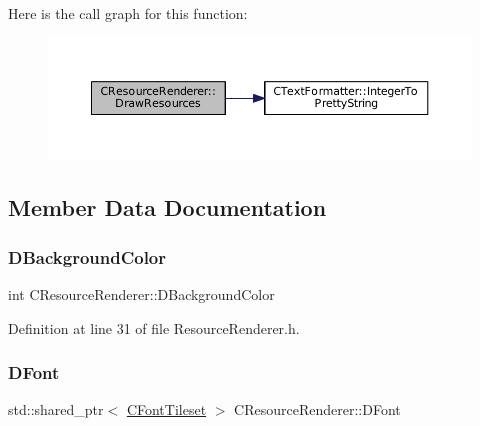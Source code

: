 Here is the call graph for this function\+:
\nopagebreak
\begin{figure}[H]
\begin{center}
\leavevmode
\includegraphics[width=350pt]{classCResourceRenderer_ad10676ab10fe217aebbc3dca68d745b0_cgraph}
\end{center}
\end{figure}


\subsection{Member Data Documentation}
\hypertarget{classCResourceRenderer_a7985a8b9266542c506acc20b12e23ebb}{}\label{classCResourceRenderer_a7985a8b9266542c506acc20b12e23ebb} 
\subsubsection{\texorpdfstring{D\+Background\+Color}{DBackgroundColor}}
{\footnotesize\ttfamily int C\+Resource\+Renderer\+::\+D\+Background\+Color\hspace{0.3cm}{\ttfamily [protected]}}



Definition at line 31 of file Resource\+Renderer.\+h.

\hypertarget{classCResourceRenderer_acd1383d226622757afdcdcf6d9747aa0}{}\label{classCResourceRenderer_acd1383d226622757afdcdcf6d9747aa0} 
\subsubsection{\texorpdfstring{D\+Font}{DFont}}
{\footnotesize\ttfamily std\+::shared\+\_\+ptr$<$ \hyperlink{classCFontTileset}{C\+Font\+Tileset} $>$ C\+Resource\+Renderer\+::\+D\+Font\hspace{0.3cm}{\ttfamily [protected]}}



